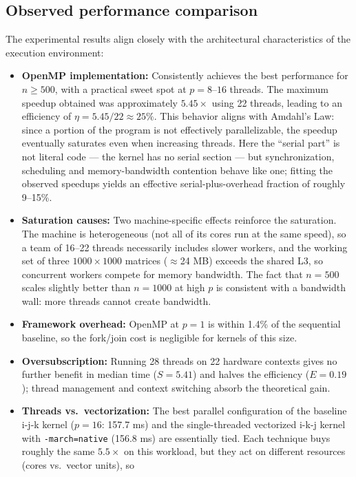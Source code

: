 \documentclass[12pt,a4paper]{article}
\begin{document}
\subsection{Observed performance comparison}
\label{sec:perfcompare}

The experimental results align closely with the architectural
characteristics of the execution environment:
\begin{itemize}
\item \textbf{OpenMP implementation:} Consistently achieves the best
performance for $n \geq 500$, with a practical sweet spot at
$p = 8$--$16$ threads. The maximum speedup obtained was approximately
$5.45\times$ using 22 threads, leading to an efficiency of
$\eta = 5.45 / 22 \approx 25\%$. This behavior aligns with Amdahl's Law:
since a portion of the program is not effectively parallelizable, the
speedup eventually saturates even when increasing threads. Here the
``serial part'' is not literal code --- the kernel has no serial section ---
but synchronization, scheduling and memory-bandwidth contention behave like
one; fitting the observed speedups yields an effective serial-plus-overhead
fraction of roughly 9--15\%.
\item \textbf{Saturation causes:} Two machine-specific effects reinforce the
saturation. The machine is heterogeneous (not all of its cores run at the
same speed), so a team of 16--22 threads necessarily includes slower
workers, and the working set of
three $1000 \times 1000$ matrices ($\approx$24 MB) exceeds the shared L3, so
concurrent workers compete for memory bandwidth. The fact that $n = 500$
scales slightly better than $n = 1000$ at high $p$ is consistent with a
bandwidth wall: more threads cannot create bandwidth.
\item \textbf{Framework overhead:} OpenMP at $p = 1$ is within 1.4\% of the
sequential baseline, so the fork/join cost is negligible for kernels of this
size.
\item \textbf{Oversubscription:} Running 28 threads on 22 hardware contexts
gives no further benefit in median time ($S = 5.41$) and halves the
efficiency ($E = 0.19$); thread management and context switching absorb the
theoretical gain.
\item \textbf{Threads vs.\ vectorization:} The best parallel configuration
of the baseline i-j-k kernel ($p = 16$: 157.7 ms) and the single-threaded
vectorized i-k-j kernel with \texttt{-march=native} (156.8 ms) are
essentially tied. Each technique buys roughly the same $5.5\times$ on this
workload, but they act on different resources (cores vs.\ vector units), so

\end{itemize}
\end{document}
